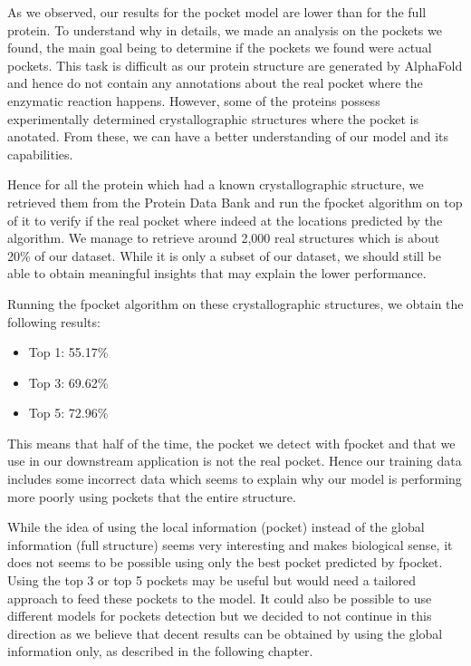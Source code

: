 As we observed, our results for the pocket model are lower than for the full protein. To understand why in
details, we made an analysis on the pockets we found, the main goal being to determine if the pockets we found
were actual pockets. This task is difficult as our protein structure are generated by AlphaFold and hence do
not contain any annotations about the real pocket where the enzymatic reaction happens. However, some of the
proteins possess experimentally determined crystallographic structures where the pocket is anotated. From 
these, we can have a better understanding of our model and its capabilities.

Hence for all the protein which had a known crystallographic structure, we retrieved them from the Protein 
Data Bank and run the fpocket algorithm on top of it to verify if the real pocket where indeed at the 
locations predicted by the algorithm. We manage to retrieve around 2,000 real structures which is about 
20\% of our dataset. While it is only a subset of our dataset, we should still be able to obtain meaningful
insights that may explain the lower performance.

Running the fpocket algorithm on these crystallographic structures, we obtain the following results:
\begin{itemize}
  \item Top 1: 55.17\%
  \item Top 3: 69.62\%
  \item Top 5: 72.96\%
\end{itemize}
This means that half of the time, the pocket we detect with fpocket and that we use in our downstream application
is not the real pocket. Hence our training data includes some incorrect data which seems to explain why
our model is performing more poorly using pockets that the entire structure.

While the idea of using the local information (pocket) instead of the global information (full structure)
seems very interesting and makes biological sense, it does not seems to be possible using only the best pocket
predicted by fpocket. 
Using the top 3 or top 5 pockets may be useful but would need a tailored approach to feed these pockets to
the model.
It could also be possible to use different models for pockets detection but we decided to not continue in this 
direction as we believe that decent results can be obtained by using the global information only, as described
in the following chapter.